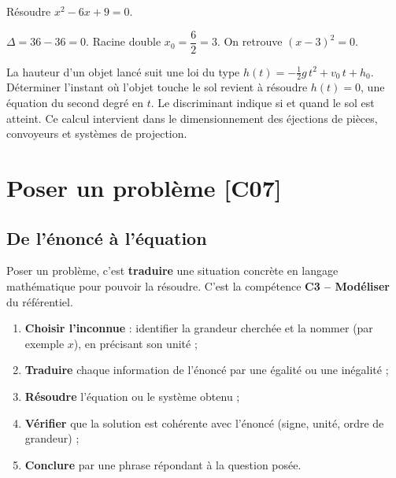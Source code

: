 \documentclass[a4paper,11pt]{article}
\begin{document}
\begin{exemple}
Résoudre $x^2 - 6x + 9 = 0$.

$\Delta = 36 - 36 = 0$. Racine double $x_0 = \dfrac{6}{2} = 3$. On retrouve $(x-3)^2 = 0$.
\end{exemple}

\begin{appliindus}
La hauteur d'un objet lancé suit une loi du type $h(t) = -\frac{1}{2}g\,t^2 + v_0\,t + h_0$. Déterminer l'instant où l'objet touche le sol revient à résoudre $h(t) = 0$, une équation du second degré en $t$. Le discriminant indique si et quand le sol est atteint. Ce calcul intervient dans le dimensionnement des éjections de pièces, convoyeurs et systèmes de projection.
\end{appliindus}

\newpage
\section{Poser un problème \hfill {\normalsize\color{uimmred}[C07]}}

\subsection{De l'énoncé à l'équation}

Poser un problème, c'est \textbf{traduire} une situation concrète en langage mathématique pour pouvoir la résoudre. C'est la compétence \textbf{C3 -- Modéliser} du référentiel.

\begin{methode}
\begin{enumerate}
  \item \textbf{Choisir l'inconnue} : identifier la grandeur cherchée et la nommer (par exemple $x$), en précisant son unité ;
  \item \textbf{Traduire} chaque information de l'énoncé par une égalité ou une inégalité ;
  \item \textbf{Résoudre} l'équation ou le système obtenu ;
  \item \textbf{Vérifier} que la solution est cohérente avec l'énoncé (signe, unité, ordre de grandeur) ;
  \item \textbf{Conclure} par une phrase répondant à la question posée.
\end{enumerate}
\end{methode}
\end{document}
